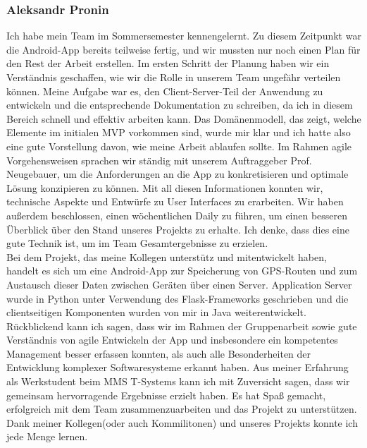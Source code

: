 \documentclass[10pt]{article}
\begin{document}
\subsubsection{Aleksandr Pronin}
    Ich habe mein Team im Sommersemester kennengelernt. Zu diesem Zeitpunkt war die Android-App bereits teilweise fertig, 
    und wir mussten nur noch einen Plan für den Rest der Arbeit erstellen.
    Im ersten Schritt der Planung haben wir ein Verständnis geschaffen, wie wir die Rolle in unserem Team ungefähr verteilen können. 
    Meine Aufgabe war es, den Client-Server-Teil der Anwendung zu entwickeln und die entsprechende Dokumentation zu schreiben,
    da ich in diesem Bereich schnell und effektiv arbeiten kann.
    Das Domänenmodell, das zeigt, welche Elemente im initialen MVP vorkommen sind, wurde mir klar und ich hatte also eine gute Vorstellung
    davon, wie meine Arbeit ablaufen sollte.  Im Rahmen agile Vorgehensweisen sprachen wir ständig mit unserem Auftraggeber Prof. Neugebauer, 
    um die Anforderungen an die App zu konkretisieren und optimale Lösung konzipieren zu können. Mit all diesen Informationen konnten wir,
    technische Aspekte und Entwürfe zu User Interfaces zu erarbeiten. Wir haben außerdem beschlossen, einen wöchentlichen Daily zu führen, 
    um einen besseren Überblick über den Stand unseres Projekts zu erhalte. Ich denke, dass dies eine gute Technik ist, um im Team Gesamtergebnisse 
    zu erzielen. \\
    Bei dem Projekt, das meine Kollegen unterstütz und mitentwickelt haben, handelt es sich um eine Android-App zur 
    Speicherung von GPS-Routen und zum Austausch dieser Daten zwischen Geräten über einen Server. Application Server wurde
    in Python unter Verwendung des Flask-Frameworks geschrieben und die clientseitigen Komponenten wurden von mir 
    in Java weiterentwickelt. \\ Rückblickend kann ich sagen, dass wir im Rahmen der Gruppenarbeit sowie  gute Verständnis von agile 
    Entwickeln der App und insbesondere ein kompetentes Management besser erfassen konnten, als auch alle Besonderheiten der Entwicklung komplexer
    Softwaresysteme erkannt haben. Aus meiner Erfahrung als Werkstudent beim MMS T-Systems kann ich mit Zuversicht sagen,
    dass wir gemeinsam hervorragende Ergebnisse erzielt haben. Es hat Spaß gemacht, erfolgreich mit dem Team zusammenzuarbeiten und das Projekt zu 
    unterstützen. Dank meiner Kollegen(oder auch Kommilitonen) und unseres Projekts konnte ich jede Menge lernen.
\end{document}
